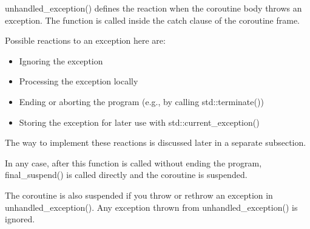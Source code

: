 unhandled\_exception() defines the reaction when the coroutine body throws an exception. The function is called inside the catch clause of the coroutine frame.

Possible reactions to an exception here are:

\begin{itemize}
\item 
Ignoring the exception

\item 
Processing the exception locally

\item 
Ending or aborting the program (e.g., by calling std::terminate())

\item 
Storing the exception for later use with std::current\_exception()
\end{itemize}

The way to implement these reactions is discussed later in a separate subsection.

In any case, after this function is called without ending the program, final\_suspend() is called directly and the coroutine is suspended.

The coroutine is also suspended if you throw or rethrow an exception in unhandled\_exception(). Any exception thrown from unhandled\_exception() is ignored.




